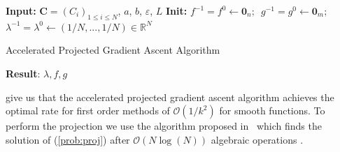 \begin{algorithm}[!ht]
\SetAlgoLined
\textbf{Input:} $\mathbf{C}=(C_i)_{1\leq i\leq N}$, $a$, $b$, $\varepsilon$, $L$
\textbf{Init:} $f^{-1}=f^0 \leftarrow \mathbf{0}_n\text{;  }$ $g^{-1} = g^0 \leftarrow \mathbf{0}_m\text{;  }$ $\lambda^{-1} = \lambda^0 \leftarrow (1/N,...,1/N)\in\mathbb{R}^N$
\caption{Accelerated Projected Gradient Ascent Algorithm\label{algo:Proj-grad}}
\textbf{Result}: $\lambda,f,g$
\end{algorithm}

\cite{beck2009fast,tseng2008accelerated} give us that the accelerated projected gradient ascent algorithm achieves the optimal rate for first order methods of $\mathcal{O}(1/k^2)$ for smooth functions. To perform the projection we use the algorithm proposed in~\cite{shalev2006efficient} which finds the solution of (\ref{prob:proj}) after $\mathcal{O}(N\log(N))$ algebraic operations \citep{wang2013projection}.









